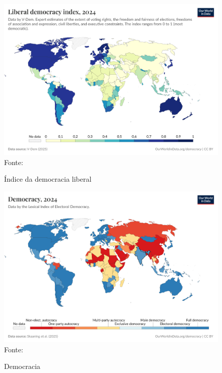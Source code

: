 \begin{figure}[ht]
    \centering
    \caption{Índice da democracia liberal}
    \includegraphics[width=1\linewidth]{figuras/democracia/liberal-democracy-index.png}
    \label{fig:liberal-democracy-index}
    \footnotesize{Fonte: \cite{liberal_democracy_index}}
\end{figure}

\begin{figure}[htbp]
    \centering
    \caption{Democracia}
    \includegraphics[width=1\linewidth]{figuras/democracia/political-regime-lexical.png}
    \label{fig:political-regime-lexical}
    \footnotesize{Fonte: \cite{political_regime_lexical}}
\end{figure}
